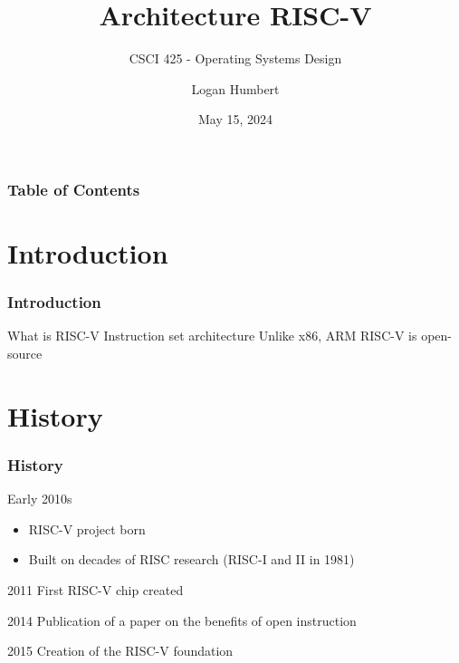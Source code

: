 \documentclass{beamer}
\title{Architecture RISC-V}
\subtitle{CSCI 425 - Operating Systems Design}
\author{Logan Humbert}
\institute{Colorado Mesa University}
\date{May 15, 2024}
\begin{document}
	\frame{\titlepage}
	
	\begin{frame}
		\frametitle{Table of Contents}
		\tableofcontents
	\end{frame}
	
	\section{Introduction}
	\begin{frame}
		\frametitle{Introduction}
		
		\begin{alertblock}{What is RISC-V}
			Instruction set architecture
			\linebreak
			Unlike x86, ARM RISC-V is open-source
		\end{alertblock}
	\end{frame}
	
	\section{History}
	\begin{frame}
		\frametitle{History}
		
		\begin{alertblock}{Early 2010s}
			\begin{itemize}
				\item RISC-V project born
				\item Built on decades of RISC research (RISC-I and II in 1981)
			\end{itemize}
		\end{alertblock}
		
		\begin{alertblock}{2011}
			First RISC-V chip created
		\end{alertblock}
		
		\begin{alertblock}{2014}
			Publication of a paper on the benefits of open instruction
		\end{alertblock}
		
		\begin{alertblock}{2015}
			Creation of the RISC-V foundation
		\end{alertblock}
	\end{frame}
	
\end{document}
